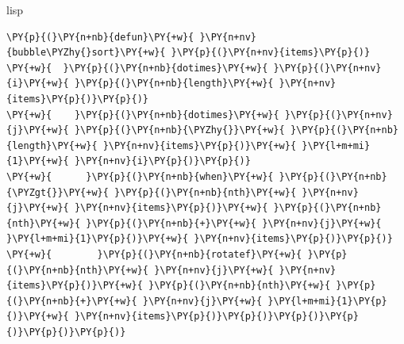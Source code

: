 \begin{code}{lisp}{}{}
\begin{Verbatim}[commandchars=\\\{\},breaklines, breakanywhere, commandchars=\\\{\},highlightlines={2-3}]
\PY{p}{(}\PY{n+nb}{defun}\PY{+w}{ }\PY{n+nv}{bubble\PYZhy{}sort}\PY{+w}{ }\PY{p}{(}\PY{n+nv}{items}\PY{p}{)}
\PY{+w}{  }\PY{p}{(}\PY{n+nb}{dotimes}\PY{+w}{ }\PY{p}{(}\PY{n+nv}{i}\PY{+w}{ }\PY{p}{(}\PY{n+nb}{length}\PY{+w}{ }\PY{n+nv}{items}\PY{p}{)}\PY{p}{)}
\PY{+w}{    }\PY{p}{(}\PY{n+nb}{dotimes}\PY{+w}{ }\PY{p}{(}\PY{n+nv}{j}\PY{+w}{ }\PY{p}{(}\PY{n+nb}{\PYZhy{}}\PY{+w}{ }\PY{p}{(}\PY{n+nb}{length}\PY{+w}{ }\PY{n+nv}{items}\PY{p}{)}\PY{+w}{ }\PY{l+m+mi}{1}\PY{+w}{ }\PY{n+nv}{i}\PY{p}{)}\PY{p}{)}
\PY{+w}{      }\PY{p}{(}\PY{n+nb}{when}\PY{+w}{ }\PY{p}{(}\PY{n+nb}{\PYZgt{}}\PY{+w}{ }\PY{p}{(}\PY{n+nb}{nth}\PY{+w}{ }\PY{n+nv}{j}\PY{+w}{ }\PY{n+nv}{items}\PY{p}{)}\PY{+w}{ }\PY{p}{(}\PY{n+nb}{nth}\PY{+w}{ }\PY{p}{(}\PY{n+nb}{+}\PY{+w}{ }\PY{n+nv}{j}\PY{+w}{ }\PY{l+m+mi}{1}\PY{p}{)}\PY{+w}{ }\PY{n+nv}{items}\PY{p}{)}\PY{p}{)}
\PY{+w}{        }\PY{p}{(}\PY{n+nb}{rotatef}\PY{+w}{ }\PY{p}{(}\PY{n+nb}{nth}\PY{+w}{ }\PY{n+nv}{j}\PY{+w}{ }\PY{n+nv}{items}\PY{p}{)}\PY{+w}{ }\PY{p}{(}\PY{n+nb}{nth}\PY{+w}{ }\PY{p}{(}\PY{n+nb}{+}\PY{+w}{ }\PY{n+nv}{j}\PY{+w}{ }\PY{l+m+mi}{1}\PY{p}{)}\PY{+w}{ }\PY{n+nv}{items}\PY{p}{)}\PY{p}{)}\PY{p}{)}\PY{p}{)}\PY{p}{)}\PY{p}{)}
\end{Verbatim}
\end{code}